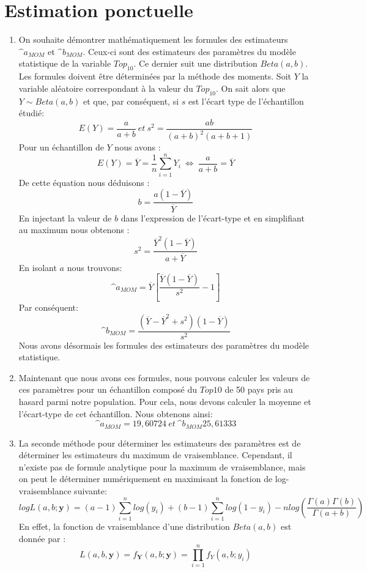 \documentclass[a4paper, 11pt]{article}
\begin{document}
\section{Estimation ponctuelle}
\begin{enumerate}[label=(\alph*)]
    \item On souhaite démontrer mathématiquement les formules des estimateurs $\^a_{MOM}$ et $\^b_{MOM}$. Ceux-ci sont des estimateurs des paramètres du modèle statistique de la variable $Top_{10}$. Ce dernier suit une distribution $Beta(a,b)$. Les formules doivent être déterminées par la méthode des moments. Soit $Y$ la variable aléatoire correspondant à la valeur du $Top_{10}$. On sait alors que $Y \sim Beta(a,b)$ et que, par conséquent, si $s$ est l'écart type de l'échantillon étudié:
    $$E(Y)=\frac{a}{a+b} ~et~s^2=\frac{ab}{(a+b)^2(a+b+1)}$$ 
    Pour un échantillon de $Y$ nous avons :
    $$E(Y)=\overline{Y}=\frac{1}{n}\sum^n_{i=1} Y_i~\Longleftrightarrow~\frac{a}{a+b}=\overline{Y}$$
    De cette équation nous déduisons :
    $$b=\frac{a(1-\overline{Y})}{\overline{Y}}$$
    En injectant la valeur de $b$ dans l'expression de l'écart-type et en simplifiant au maximum nous obtenons :
    $$s^2=\frac{\overline{Y}^2(1-\overline{Y})}{a+\overline{Y}}$$
    En isolant $a$ nous trouvons:
    $$\^a_{MOM}=\overline{Y}\left[\frac{\overline{Y}(1-\overline{Y})}{s^2}-1\right]$$
    Par conséquent:
    $$\^b_{MOM}=\frac{(\overline{Y}-\overline{Y}^2+s^2)(1-\overline{Y})}{s^2}$$
    Nous avons désormais les formules des estimateurs des paramètres du modèle statistique.
    \item Maintenant que nous avons ces formules, nous pouvons calculer les valeurs de ces paramètres pour un échantillon composé du $Top10$ de 50 pays pris au hasard parmi notre population. Pour cela, nous devons calculer la moyenne et  l'écart-type de cet échantillon. Nous obtenons ainsi:
    $$\^a_{MOM}=19,60724~et~\^b_{MOM}25,61333$$
    \item La seconde méthode pour déterminer les estimateurs des paramètres est de déterminer les estimateurs du maximum de vraisemblance. Cependant, il n'existe pas de formule analytique pour la maximum de vraisemblance, mais on peut le déterminer numériquement en maximisant la fonction de log-vraisemblance suivante:
    $$ log L(a,b;\textbf{y})= (a-1)\sum_{i=1}^n log(y_i) +  (b-1)\sum_{i=1}^n log(1-y_i) -n log\left(\frac{\Gamma(a) \Gamma(b)}{\Gamma (a+b)}\right)$$
    En effet, la fonction de vraisemblance d'une distribution $Beta(a,b)$ est donnée par :
    $$L(a,b,\textbf{y})=f_{\textbf{Y}}(a,b;\textbf{y})=\prod_{i=1}^n f_Y(a,b;y_i)$$

\end{enumerate}
\end{document}
